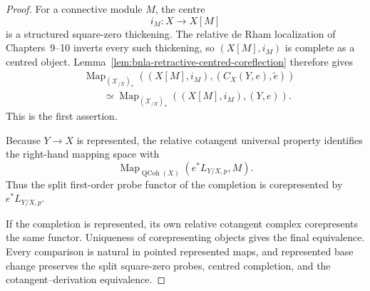 \begin{proof}
For a connective module $M$, the centre
\[
    i_M:X\longrightarrow X[M]
\]
is a structured square-zero thickening.  The relative de Rham localization of
Chapters~9--10 inverts every such thickening, so $(X[M],i_M)$ is complete as a
centred object.  Lemma~\ref{lem:bnla-retractive-centred-coreflection} therefore
gives
\[
\begin{aligned}
&\operatorname{Map}_{(\mathcal X_{/X})_*}
\left(
    (X[M],i_M),(C_X(Y,e),\widetilde e)
\right)
\\
&\qquad\simeq
\operatorname{Map}_{(\mathcal X_{/X})_*}
\left(
    (X[M],i_M),(Y,e)
\right).
\end{aligned}
\]
This is the first assertion.

Because $Y\to X$ is represented, the relative cotangent universal property
identifies the right-hand mapping space with
\[
    \operatorname{Map}_{\operatorname{QCoh}(X)}
    \left(
        e^*L_{Y/X,p},M
    \right).
\]
Thus the split first-order probe functor of the completion is corepresented by
$e^*L_{Y/X,p}$.

If the completion is represented, its own relative cotangent complex
corepresents the same functor.  Uniqueness of corepresenting objects gives the
final equivalence.  Every comparison is natural in pointed represented maps,
and represented base change preserves the split square-zero probes, centred
completion, and the cotangent--derivation equivalence.
\end{proof}

